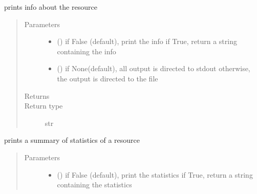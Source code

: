 \documentclass[letterpaper,10pt,english]{sphinxmanual}
\begin{document}
\begin{fulllineitems}
\begin{fulllineitems}
\begin{quote}
\begin{description}
\end{description}\end{quote}

\end{fulllineitems}


\begin{fulllineitems}
\label{\detokenize{Reference:salabim.Resource.print_info}}
prints info about the resource
\begin{quote}\begin{description}
\item[{Parameters}] \leavevmode\begin{itemize}
\item {} 
 () \textendash{} if False (default), print the info
if True, return a string containing the info

\item {} 
 () \textendash{} if None(default), all output is directed to stdout 
otherwise, the output is directed to the file

\end{itemize}

\item[{Returns}] \leavevmode
{}

\item[{Return type}] \leavevmode
str

\end{description}\end{quote}

\end{fulllineitems}


\begin{fulllineitems}
\label{\detokenize{Reference:salabim.Resource.print_statistics}}
prints a summary of statistics of a resource
\begin{quote}\begin{description}
\item[{Parameters}] \leavevmode\begin{itemize}
\item {} 
 () \textendash{} if False (default), print the statistics
if True, return a string containing the statistics


\end{itemize}
\end{description}
\end{quote}
\end{fulllineitems}
\end{fulllineitems}
\end{document}

